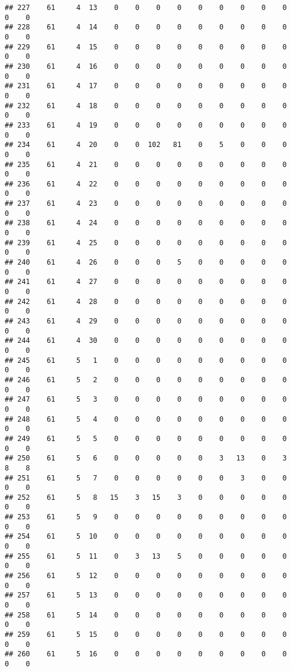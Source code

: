 \documentclass[]{article}
\begin{document}
\begin{verbatim}
## 227    61     4  13    0    0    0    0    0    0    0    0    0    0    0
## 228    61     4  14    0    0    0    0    0    0    0    0    0    0    0
## 229    61     4  15    0    0    0    0    0    0    0    0    0    0    0
## 230    61     4  16    0    0    0    0    0    0    0    0    0    0    0
## 231    61     4  17    0    0    0    0    0    0    0    0    0    0    0
## 232    61     4  18    0    0    0    0    0    0    0    0    0    0    0
## 233    61     4  19    0    0    0    0    0    0    0    0    0    0    0
## 234    61     4  20    0    0  102   81    0    5    0    0    0    0    0
## 235    61     4  21    0    0    0    0    0    0    0    0    0    0    0
## 236    61     4  22    0    0    0    0    0    0    0    0    0    0    0
## 237    61     4  23    0    0    0    0    0    0    0    0    0    0    0
## 238    61     4  24    0    0    0    0    0    0    0    0    0    0    0
## 239    61     4  25    0    0    0    0    0    0    0    0    0    0    0
## 240    61     4  26    0    0    0    5    0    0    0    0    0    0    0
## 241    61     4  27    0    0    0    0    0    0    0    0    0    0    0
## 242    61     4  28    0    0    0    0    0    0    0    0    0    0    0
## 243    61     4  29    0    0    0    0    0    0    0    0    0    0    0
## 244    61     4  30    0    0    0    0    0    0    0    0    0    0    0
## 245    61     5   1    0    0    0    0    0    0    0    0    0    0    0
## 246    61     5   2    0    0    0    0    0    0    0    0    0    0    0
## 247    61     5   3    0    0    0    0    0    0    0    0    0    0    0
## 248    61     5   4    0    0    0    0    0    0    0    0    0    0    0
## 249    61     5   5    0    0    0    0    0    0    0    0    0    0    0
## 250    61     5   6    0    0    0    0    0    3   13    0    3    8    8
## 251    61     5   7    0    0    0    0    0    0    3    0    0    0    0
## 252    61     5   8   15    3   15    3    0    0    0    0    0    0    0
## 253    61     5   9    0    0    0    0    0    0    0    0    0    0    0
## 254    61     5  10    0    0    0    0    0    0    0    0    0    0    0
## 255    61     5  11    0    3   13    5    0    0    0    0    0    0    0
## 256    61     5  12    0    0    0    0    0    0    0    0    0    0    0
## 257    61     5  13    0    0    0    0    0    0    0    0    0    0    0
## 258    61     5  14    0    0    0    0    0    0    0    0    0    0    0
## 259    61     5  15    0    0    0    0    0    0    0    0    0    0    0
## 260    61     5  16    0    0    0    0    0    0    0    0    0    0    0

\end{verbatim}
\end{document}
